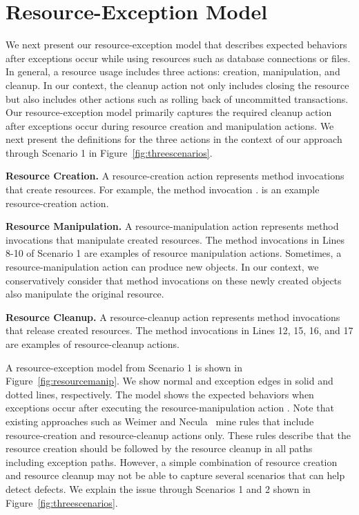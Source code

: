 \section{Resource-Exception Model}
\label{sec:resexcmodel}

We next present our resource-exception model that describes expected behaviors after
exceptions occur while using resources such as database connections or files. In general,
a resource usage includes three actions: creation, manipulation, and cleanup. In our context, the cleanup
action not only includes closing the resource but also includes other actions such as 
rolling back of uncommitted transactions. Our resource-exception model primarily
captures the required cleanup action after exceptions occur during resource 
creation and manipulation actions. We next present the definitions for the three actions 
in the context of our approach through Scenario 1 in Figure~\ref{fig:threescenarios}.

\textbf{Resource Creation.} A resource-creation action represents method invocations
that create resources. For example, the method invocation .
is an example resource-creation action. 

\textbf{Resource Manipulation.} A resource-manipulation action represents method invocations
that manipulate created resources. The method invocations in Lines 8-10 of Scenario 1 are examples of resource
manipulation actions. Sometimes, a resource-manipulation action can produce
new objects. In our context, we conservatively consider that method invocations on these newly created objects also
manipulate the original resource.

\textbf{Resource Cleanup.} A resource-cleanup action represents method invocations
that release created resources. The method invocations in Lines 12, 15, 16, and 17
are examples of resource-cleanup actions.

A resource-exception model from Scenario 1 is shown in Figure~\ref{fig:resourcemanip}.
We show normal and exception edges in solid and dotted lines, respectively. The model
shows the expected behaviors when exceptions occur after executing the resource-manipulation
action . Note that existing 
approaches such as Weimer and Necula~\cite{WeimerN05} mine rules 
that include resource-creation and resource-cleanup actions only. These rules
describe that the resource creation should be followed by the
resource cleanup in all paths including exception paths. However, 
a simple combination of resource creation and resource cleanup may not be
able to capture several scenarios that can help detect defects.
We explain the issue through Scenarios 1 and 2 shown in Figure~\ref{fig:threescenarios}.

